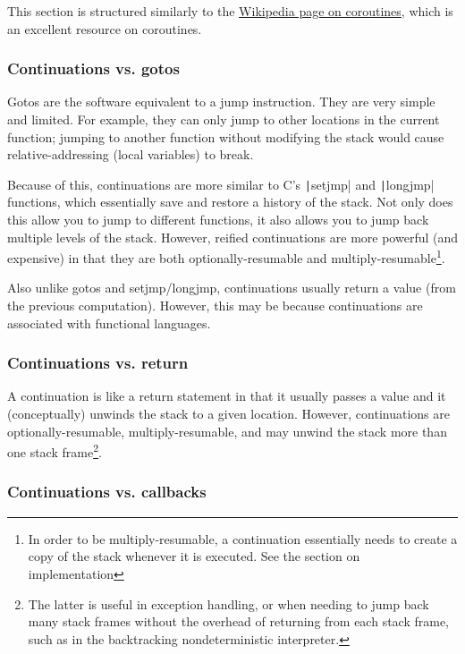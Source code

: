 \documentclass[]{article}
\begin{document}
This section is structured similarly to the \href{https://en.wikipedia.org/wiki/Coroutine}{Wikipedia page on coroutines}, which is an excellent resource on coroutines.

\subsubsection{Continuations vs. gotos}
\label{sec:goto}

Gotos are the software equivalent to a jump instruction. They are very simple and limited. For example, they can only jump to other locations in the current function; jumping to another function without modifying the stack would cause relative-addressing (local variables) to break.

Because of this, continuations are more similar to C's \texttt|setjmp| and \texttt|longjmp| functions, which essentially save and restore a history of the stack. Not only does this allow you to jump to different functions, it also allows you to jump back multiple levels of the stack. However, reified continuations are more powerful (and expensive) in that they are both optionally-resumable and multiply-resumable\footnote{In order to be multiply-resumable, a continuation essentially needs to create a copy of the stack whenever it is executed. See the section on implementation}.

Also unlike gotos and setjmp/longjmp, continuations usually return a value (from the previous computation). However, this may be because continuations are associated with functional languages.

\subsubsection{Continuations vs. return}
\label{sec:retu}

A continuation is like a return statement in that it usually passes a value and it (conceptually) unwinds the stack to a given location. However, continuations are optionally-resumable, multiply-resumable, and may unwind the stack more than one stack frame\footnote{The latter is useful in exception handling, or when needing to jump back many stack frames without the overhead of returning from each stack frame, such as in the backtracking nondeterministic interpreter.}.

\subsubsection{Continuations vs. callbacks}
\label{sec:call}
\end{document}

